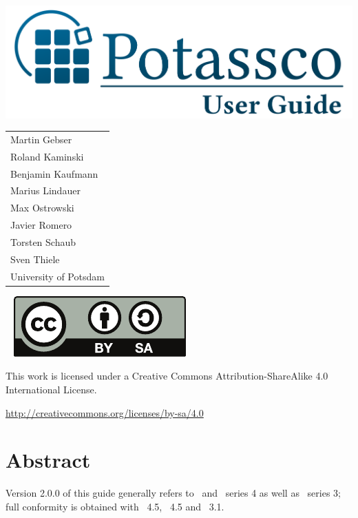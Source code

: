 \thispagestyle{empty}
\bigskip
\noindent
\includegraphics[width=\textwidth]{potassco_logo_blue}
\bigskip

\vfill

\hspace{5pt}
{\Large\color{potcolor}
\begin{tabular}{l}
Martin Gebser \\
Roland Kaminski \\
Benjamin Kaufmann \\
Marius Lindauer \\
Max Ostrowski \\
Javier Romero \\
Torsten Schaub \\
Sven Thiele \\[30pt]
University of Potsdam
\end{tabular}}

\newpage
\thispagestyle{empty}\ 
\vfill
\noindent
\includegraphics{by-sa}

\bigskip

\noindent
This work is licensed under a Creative Commons Attribution-ShareAlike 4.0\\ International License.

\medskip

\noindent
\url{http://creativecommons.org/licenses/by-sa/4.0}
\newpage
\thispagestyle{empty}\ 
\section*{Abstract}


\bigskip
\noindent
Version 2.0.0 of this guide generally refers to \gringo\ and \clingo\ series 4 as well as \clasp\ series 3;
full conformity is obtained with \gringo~4.5, \clingo~4.5 and \clasp~3.1.

